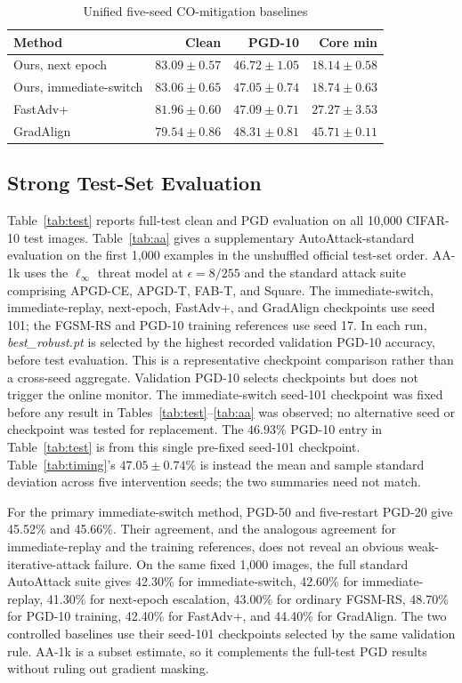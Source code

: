 \begin{table}[t]
\centering
\caption{Unified five-seed CO-mitigation baselines}
\label{tab:baselines}
\scriptsize
\setlength{\tabcolsep}{3pt}
\begin{tabular}{lrrr}
\toprule
Method & Clean & PGD-10 & Core min \\
\midrule
Ours, next epoch & $83.09\pm0.57$ & $46.72\pm1.05$ & $18.14\pm0.58$ \\
Ours, immediate-switch & $83.06\pm0.65$ & $47.05\pm0.74$ & $18.74\pm0.63$ \\
FastAdv+ & $81.96\pm0.60$ & $47.09\pm0.71$ & $27.27\pm3.53$ \\
GradAlign & $79.54\pm0.86$ & $48.31\pm0.81$ & $45.71\pm0.11$ \\
\bottomrule
\end{tabular}
\end{table}

\subsection{Strong Test-Set Evaluation}
Table~\ref{tab:test} reports full-test clean and PGD evaluation on all 10,000
CIFAR-10 test images. Table~\ref{tab:aa} gives a supplementary
AutoAttack-standard evaluation on
the first 1,000 examples in the unshuffled official test-set order. AA-1k uses
the $\ell_\infty$ threat model at $\epsilon=8/255$ and the standard attack
suite comprising APGD-CE, APGD-T, FAB-T, and Square. The immediate-switch, immediate-replay,
next-epoch, FastAdv+, and GradAlign checkpoints use seed 101; the FGSM-RS and
PGD-10 training references use seed 17. In each run,
\emph{best\_robust.pt} is selected by the highest recorded validation PGD-10
accuracy, before test evaluation. This is a representative checkpoint
comparison rather than a cross-seed aggregate. Validation PGD-10 selects
checkpoints but does not trigger the online monitor. The immediate-switch
seed-101 checkpoint was fixed before
any result in Tables~\ref{tab:test}--\ref{tab:aa} was observed; no alternative
seed or checkpoint was tested for replacement.
The $46.93\%$ PGD-10 entry in Table~\ref{tab:test} is from this single
pre-fixed seed-101 checkpoint. Table~\ref{tab:timing}'s $47.05\pm0.74\%$ is
instead the mean and sample standard deviation across five intervention seeds;
the two summaries need not match.

For the primary immediate-switch method, PGD-50 and five-restart PGD-20 give 45.52\%
and 45.66\%. Their agreement, and the analogous agreement for immediate-replay and the
training references, does not reveal an obvious weak-iterative-attack failure.
On the same fixed 1,000 images, the full standard AutoAttack suite gives
42.30\% for immediate-switch, 42.60\% for immediate-replay, 41.30\%
for next-epoch escalation, 43.00\%
for ordinary FGSM-RS, 48.70\% for PGD-10 training, 42.40\% for FastAdv+, and
44.40\% for GradAlign. The two controlled baselines use their seed-101
checkpoints selected by the same validation rule. AA-1k is a subset estimate,
so it complements the full-test PGD results without ruling out gradient masking.

